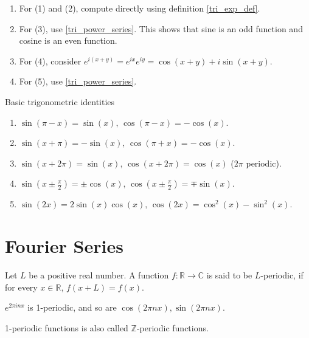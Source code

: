 \documentclass[12pt]{article}
\begin{document}
\begin{pfbox}
    \begin{enumerate}
        \item For (1) and (2), compute directly using definition \eqref{tri_exp_def}.
        \item For (3), use \eqref{tri_power_series}. This shows that sine is an odd function and cosine is an even function.
        \item For (4), consider $e^{i(x+y)} = e^{ix}e^{iy}= \cos(x+y) + i\sin(x+y).$ 
        \item For (5), use \eqref{tri_power_series}.        
    \end{enumerate}
\end{pfbox}

\begin{exercise}
    Basic trigonometric identities
    \begin{enumerate}
        \item $\sin(\pi-x)=\sin(x), \, \cos(\pi-x)=-\cos(x)$.
        \item $\sin(x+\pi)=-\sin(x), \, \cos(\pi+x)=-\cos(x)$.
        \item $\sin(x+2\pi)=\sin(x), \, \cos(x+2\pi)=\cos(x)$ ($2\pi$ periodic).
        \item $\sin(x \pm \tfrac{\pi}{2}) = \pm \cos(x), \, \cos(x\pm\tfrac{\pi}{2}) = \mp\sin(x)$.
        \item $\sin(2x)=2\sin(x)\cos(x), \, \cos(2x)=\cos^2(x)-\sin^2(x)$.
    \end{enumerate}
\end{exercise}



\section{Fourier Series}


\begin{definition}
    Let $L$ be a positive real number.
    A function $f:\mathbb{R}\rightarrow\mathbb{C}$ is said to be $L$-periodic, 
    if for every $x\in\mathbb{R},\, f(x+L)=f(x).$
\end{definition}


\begin{example}
    $e^{2\pi inx}$ is 1-periodic, and so are $\cos(2\pi nx), \sin(2\pi nx)$.
\end{example}

\begin{remark}
    1-periodic functions is also called $\mathbb{Z}$-periodic functions.
\end{remark}
\end{document}
